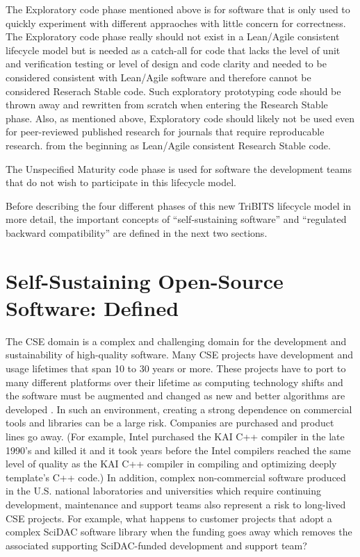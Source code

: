 \documentclass[11pt]{SANDreport}
\begin{document}
The Exploratory code phase mentioned above is for software that is
only used to quickly experiment with different appraoches with little
concern for correctness.  The Exploratory code phase really should not
exist in a Lean/Agile consistent lifecycle model but is needed as a
catch-all for code that lacks the level of unit and verification
testing or level of design and code clarity and needed to be
considered consistent with Lean/Agile software and therefore cannot be
considered Reserach Stable code.  Such exploratory prototyping code
should be thrown away and rewritten from scratch when entering the
Research Stable phase.  Also, as mentioned above, Exploratory code
should likely not be used even for peer-reviewed published research
for journals that require reproducable research.  from the beginning
as Lean/Agile consistent Research Stable code.

The Unspecified Maturity code phase is used for software the
development teams that do not wish to participate in this lifecycle
model.

Before describing the four different phases of this new TriBITS
lifecycle model in more detail, the important concepts of
``self-sustaining software'' and ``regulated backward compatibility''
are defined in the next two sections.


%
{}\section{Self-Sustaining Open-Source Software: Defined}
\label{sec:self_sustaining_open_source_software}
%

The CSE domain is a complex and challenging domain for the development
and sustainability of high-quality software.  Many CSE projects have
development and usage lifetimes that span 10 to 30 years or more.
These projects have to port to many different platforms over their
lifetime as computing technology shifts and the software must be
augmented and changed as new and better algorithms are developed
{}\cite{HPCNeedsAToolsStrategy05}.  In such an environment, creating a
strong dependence on commercial tools and libraries can be a large
risk.  Companies are purchased and product lines go away.  (For
example, Intel purchased the KAI C++ compiler in the late 1990's and
killed it and it took years before the Intel compilers reached the
same level of quality as the KAI C++ compiler in compiling and
optimizing deeply template's C++ code.)  In addition, complex
non-commercial software produced in the U.S. national laboratories and
universities which require continuing development, maintenance and
support teams also represent a risk to long-lived CSE projects.  For
example, what happens to customer projects that adopt a complex SciDAC
software library when the funding goes away which removes the
associated supporting SciDAC-funded development and support team?
\end{document}

